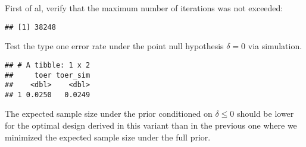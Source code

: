 \documentclass[
]{book}
\newenvironment{Shaded}{\begin{snugshade}}{\end{snugshade}}
\newcommand{\AttributeTok}[1]{\textcolor[rgb]{0.77,0.63,0.00}{#1}}
\newcommand{\DecValTok}[1]{\textcolor[rgb]{0.00,0.00,0.81}{#1}}
\newcommand{\FunctionTok}[1]{\textcolor[rgb]{0.00,0.00,0.00}{#1}}
\newcommand{\NormalTok}[1]{#1}
\newcommand{\OtherTok}[1]{\textcolor[rgb]{0.56,0.35,0.01}{#1}}
\newcommand{\SpecialCharTok}[1]{\textcolor[rgb]{0.00,0.00,0.00}{#1}}
\newcommand{\StringTok}[1]{\textcolor[rgb]{0.31,0.60,0.02}{#1}}
\begin{document}
First of al, verify that the maximum number of iterations was not exceeded:

\begin{Shaded}
\end{Shaded}

\begin{verbatim}
## [1] 38248
\end{verbatim}

Test the type one error rate under the point null hypothesis \(\delta=0\) via simulation.

\begin{Shaded}
\end{Shaded}

\begin{verbatim}
## # A tibble: 1 x 2
##     toer toer_sim
##    <dbl>    <dbl>
## 1 0.0250   0.0249
\end{verbatim}

The expected sample size under the prior conditioned on \(\delta\leq 0\) should be lower for the optimal design derived in this variant than in the previous one where we minimized the expected sample size under the full prior.

\begin{Shaded}
\end{Shaded}
\end{document}
